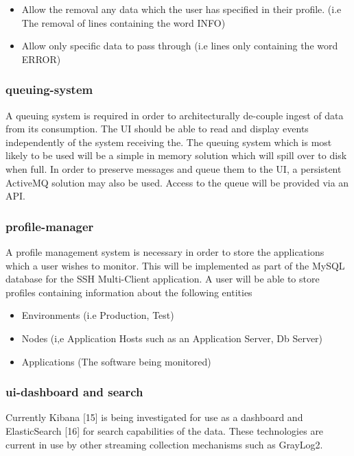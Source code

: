 \documentclass{llncs}
\begin{document}
\begin{itemize}
\item	Allow the removal any data which the user has specified in their profile. (i.e The removal of lines containing the word INFO)
\item	Allow only specific data to pass through (i.e lines only containing the word ERROR)
\end{itemize}
\subsubsection{queuing-system}

A queuing system is required in order to architecturally de-couple ingest of data from its consumption. The UI should be able to read and display events independently of the system receiving the. The queuing system which is most likely to be used will be a simple in memory solution which will spill over to disk when full. In order to preserve messages and queue them to the UI, a persistent ActiveMQ solution may also be used. Access to the queue will be provided via an API.


\subsubsection{profile-manager}
	
A profile management system is necessary in order to store the applications which a user wishes to monitor. This will be implemented as part of the MySQL database for the SSH Multi-Client application. A user will be able to store profiles containing information about the following entities

\begin{itemize}
\item	Environments (i.e Production, Test)
\item	Nodes (i,e Application Hosts such as an Application Server, Db Server)
\item	Applications (The software being monitored)
\end{itemize}
\subsubsection{ui-dashboard and search}

Currently Kibana [15] is being investigated for use as a dashboard and ElasticSearch [16] for search capabilities of the data. These technologies are current in use by other streaming collection mechanisms such as GrayLog2. 
\end{document}
